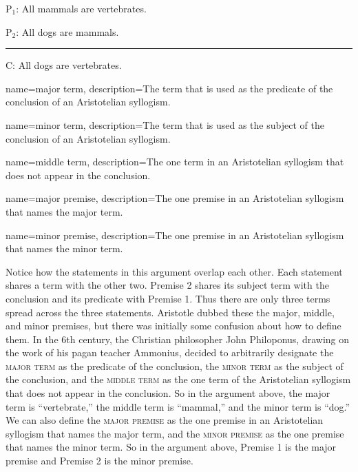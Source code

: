 \begin{earg}
\item[P$_1$:] All mammals are vertebrates.
\item[P$_2$:] All dogs are mammals.
\vspace{-.5em}
\item [] \rule{0.3\linewidth}{.5pt} 
\item[C:] All dogs are vertebrates. 
\end{earg} 
\label{AAA_arg}

{
name=major term,
description={The term that is used as the predicate of the conclusion of an Aristotelian syllogism.}
}

{
name=minor term,
description={The term that is used as the subject of the conclusion of an Aristotelian syllogism.}
}

{
name=middle term,
description={The one term in an Aristotelian syllogism that does not appear in the conclusion.}
}

{
name=major premise,
description={The one premise in an Aristotelian syllogism that names the major term.}
}

{
name=minor premise,
description={The one premise in an Aristotelian syllogism that names the minor term.}
}

Notice how the statements in this argument overlap each other. Each statement shares a term with the other two. Premise 2 shares its subject term with the conclusion and its predicate with Premise 1. Thus there are only three terms spread across the three statements. Aristotle dubbed these the major, middle, and minor premises, but there was initially some confusion about how to define them. In the 6th century, the Christian philosopher John Philoponus, drawing on the work of his pagan teacher Ammonius, decided to arbitrarily designate the \textsc{\gls{major term}} as the predicate of the conclusion, the \textsc{\gls{minor term}} as the subject of the conclusion, and the \textsc{\gls{middle term}} as the one term of the Aristotelian syllogism that does not appear in the conclusion. So in the argument above, the major term is ``vertebrate,'' the middle term is ``mammal,'' and the minor term is ``dog.'' We can also define the \textsc{\gls{major premise}} as the one premise in an Aristotelian syllogism that names the major term, and the \textsc{\gls{minor premise}} as the one premise that names the minor term. So in the argument above, Premise 1 is the major premise and Premise 2 is the minor premise. 

